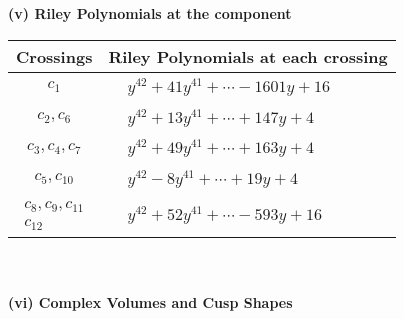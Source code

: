 \documentclass[1p]{elsarticle_modified}
\theoremstyle{definition}
\begin{document}
\newpage\renewcommand{\arraystretch}{1}
\flushleft \textbf{(v) Riley Polynomials at the component}\newline \\
\begin{tabular}{m{50pt}|m{274pt}}
Crossings & \hspace{64pt}Riley Polynomials at each crossing \\
\hline $$\begin{aligned}c_{1}\end{aligned}$$&$\begin{aligned}
&y^{42}+41 y^{41}+\cdots-1601 y+16
\end{aligned}$\\
\hline $$\begin{aligned}c_{2},c_{6}\end{aligned}$$&$\begin{aligned}
&y^{42}+13 y^{41}+\cdots+147 y+4
\end{aligned}$\\
\hline $$\begin{aligned}c_{3},c_{4},c_{7}\end{aligned}$$&$\begin{aligned}
&y^{42}+49 y^{41}+\cdots+163 y+4
\end{aligned}$\\
\hline $$\begin{aligned}c_{5},c_{10}\end{aligned}$$&$\begin{aligned}
&y^{42}-8 y^{41}+\cdots+19 y+4
\end{aligned}$\\
\hline $$\begin{aligned}c_{8},c_{9},c_{11}\\c_{12}\end{aligned}$$&$\begin{aligned}
&y^{42}+52 y^{41}+\cdots-593 y+16
\end{aligned}$\\
\hline
\end{tabular}\\~\\
\newpage\flushleft \textbf{(vi) Complex Volumes and Cusp Shapes}
\end{document}

